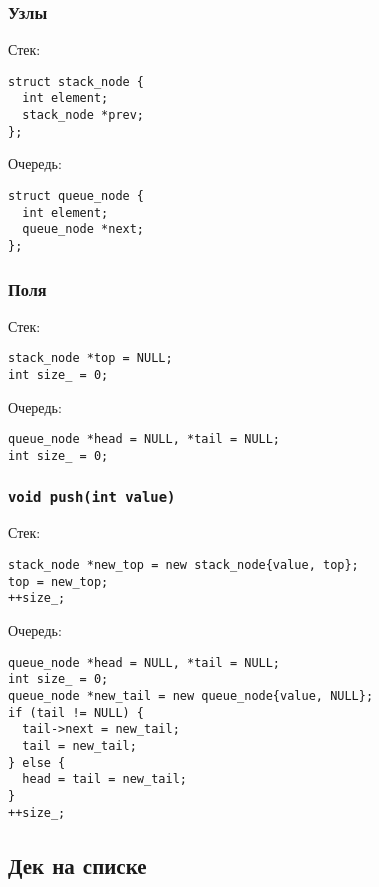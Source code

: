 \documentclass[pdf,russian,aspectratio=169]{beamer}
\begin{document}
\begin{frame}[fragile]
  \frametitle{Узлы}
  Стек:
  \begin{verbatim}
struct stack_node {
  int element;
  stack_node *prev;
};
  \end{verbatim}
  \pause
  \vspace{1em}
  Очередь:
  \begin{verbatim}
struct queue_node {
  int element;
  queue_node *next;
};
  \end{verbatim}
\end{frame}

\begin{frame}[fragile]
  \frametitle{Поля}
  Стек:
  \begin{verbatim}
stack_node *top = NULL;
int size_ = 0;
  \end{verbatim}
  \pause
  \vspace{1em}
  Очередь:
  \begin{verbatim}
queue_node *head = NULL, *tail = NULL;
int size_ = 0;
  \end{verbatim}
\end{frame}

\begin{frame}[fragile]
  \frametitle{\texttt{void push(int value)}}
  Стек:
  \begin{verbatim}
stack_node *new_top = new stack_node{value, top};
top = new_top;
++size_;
  \end{verbatim}
  \pause
  \vspace{1em}
  Очередь:
  \begin{verbatim}
queue_node *head = NULL, *tail = NULL;
int size_ = 0;
queue_node *new_tail = new queue_node{value, NULL};
if (tail != NULL) {
  tail->next = new_tail;
  tail = new_tail;
} else {
  head = tail = new_tail;
}
++size_;
  \end{verbatim}
\end{frame}

\subsection{Дек на списке}
\end{document}
